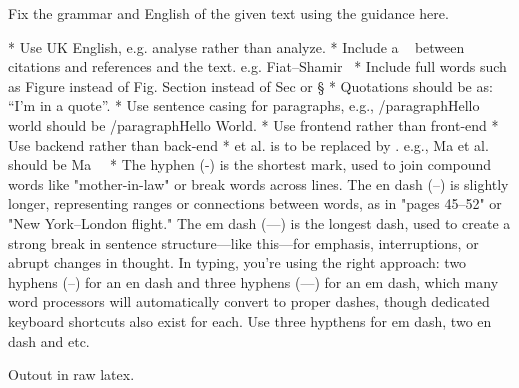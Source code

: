 Fix the grammar and English of the given text using the guidance here.

* Use UK English, e.g. analyse rather than analyze.
* Include a ~ between citations and references and the text. e.g. Fiat--Shamir~\cite{}
* Include full words such as Figure instead of Fig. Section instead of Sec or \S
* Quotations should be as: ``I'm in a quote''.
* Use sentence casing for paragraphs, e.g., /paragraph{Hello world} should be /paragraph{Hello World.}
* Use frontend rather than front-end
* Use backend rather than back-end
* et al. is to be replaced by \etal. e.g., Ma et al. \cite{x} should be Ma~\etal~\cite{x}
* The hyphen (-) is the shortest mark, used to join compound words like "mother-in-law" or break words across lines. The en dash (–) is slightly longer, representing ranges or connections between words, as in "pages 45–52" or "New York–London flight." The em dash (—) is the longest dash, used to create a strong break in sentence structure—like this—for emphasis, interruptions, or abrupt changes in thought. In typing, you're using the right approach: two hyphens (--) for an en dash and three hyphens (---) for an em dash, which many word processors will automatically convert to proper dashes, though dedicated keyboard shortcuts also exist for each. Use three hypthens for em dash, two en dash and etc.

Outout in raw latex.